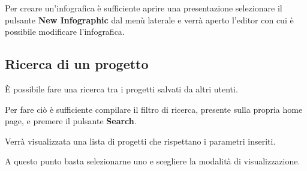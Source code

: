 Per creare un'infografica è sufficiente aprire una presentazione selezionare il pulsante \textbf{New Infographic} dal menù laterale e verrà aperto l'editor con cui è possibile modificare l'infografica.

\subsection{Ricerca di un progetto}

È possibile fare una ricerca tra i progetti salvati da altri utenti.

\noindent Per fare ciò è sufficiente compilare il filtro di ricerca, presente sulla propria home page, e premere il pulsante \textbf{Search}.


Verrà visualizzata una lista di progetti che rispettano i parametri inseriti.


\noindent A questo punto basta selezionarne uno e scegliere la modalità di visualizzazione.